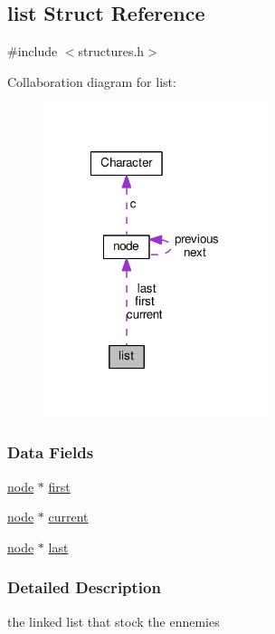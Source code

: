 \hypertarget{structlist}{\subsection{list Struct Reference}
\label{structlist}
}


{\ttfamily \#include $<$structures.\-h$>$}



Collaboration diagram for list\-:
\nopagebreak
\begin{figure}[H]
\begin{center}
\leavevmode
\includegraphics[width=186pt]{structlist__coll__graph}
\end{center}
\end{figure}
\subsubsection*{Data Fields}
\begin{DoxyCompactItemize}
\item 
\hyperlink{structnode}{node} $\ast$ \hyperlink{structlist_a02b4428208fd0060bb54d5bb726702d4}{first}
\item 
\hyperlink{structnode}{node} $\ast$ \hyperlink{structlist_a79bec8ecf9f3599d31d97683cc6f6c54}{current}
\item 
\hyperlink{structnode}{node} $\ast$ \hyperlink{structlist_a1e751cb2643f0c20321d5b233e4fdf65}{last}
\end{DoxyCompactItemize}


\subsubsection{Detailed Description}
the linked list that stock the ennemies 

